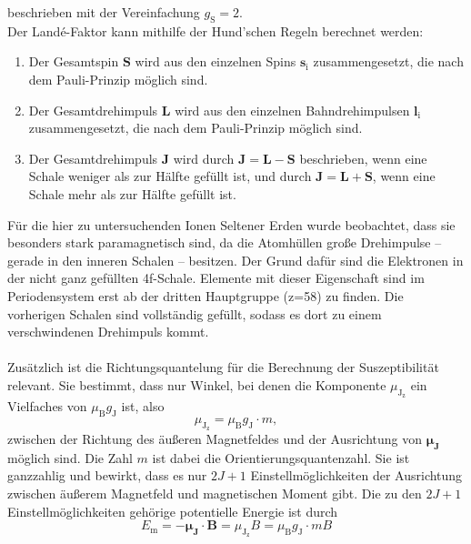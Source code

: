     beschrieben mit der Vereinfachung $g_\text{S} = 2$.\\
    Der Landé-Faktor kann mithilfe der Hund'schen Regeln berechnet werden:
    \begin{enumerate}
        \label{Hundsche_Regeln}
        \item Der Gesamtspin $\symbf{S}$ wird aus den einzelnen Spins $\symbf{s}_\text{i}$ zusammengesetzt,
        die nach dem Pauli-Prinzip möglich sind.
        \item Der Gesamtdrehimpuls $\symbf{L}$ wird aus den einzelnen Bahndrehimpulsen $\symbf{l}_\text{i}$ zusammengesetzt,
        die nach dem Pauli-Prinzip möglich sind.
        \item Der Gesamtdrehimpuls $\symbf{J}$ wird durch $\symbf{J} = \symbf{L} - \symbf{S}$ beschrieben,
        wenn eine Schale weniger als zur Hälfte gefüllt ist,
        und durch $\symbf{J} = \symbf{L} + \symbf{S}$,
        wenn eine Schale mehr als zur Hälfte gefüllt ist.
    \end{enumerate}
    Für die hier zu untersuchenden Ionen Seltener Erden wurde beobachtet,
    dass sie besonders stark paramagnetisch sind,
    da die Atomhüllen große Drehimpulse
    – gerade in den inneren Schalen –
    besitzen.
    Der Grund dafür sind die Elektronen in der nicht ganz gefüllten 4f-Schale.
    Elemente mit dieser Eigenschaft sind im Periodensystem erst ab der dritten Hauptgruppe (z=58) zu finden.
    Die vorherigen Schalen sind vollständig gefüllt,
    sodass es dort zu einem verschwindenen Drehimpuls kommt.\\
    \\
    Zusätzlich ist die Richtungsquantelung für die Berechnung der Suszeptibilität relevant.
    Sie bestimmt,
    dass nur Winkel,
    bei denen die Komponente $\mu_{\text{J}_\text{z}}$ ein Vielfaches von $\mu_\text{B} g_\text{J}$ ist,
    also
    \begin{equation*}
        \mu_{\text{J}_\text{z}} = \mu_\text{B} g_\text{J} \cdot m ,
    \end{equation*}
    zwischen der Richtung des äußeren Magnetfeldes und der Ausrichtung von $\symbf{\mu_\text{J}}$ möglich sind.
    Die Zahl $m$ ist dabei die Orientierungsquantenzahl.
    Sie ist ganzzahlig und bewirkt,
    dass es nur $2J+1$ Einstellmöglichkeiten der Ausrichtung zwischen äußerem Magnetfeld und magnetischen Moment gibt.
    Die zu den $2J+1$ Einstellmöglichkeiten gehörige potentielle Energie ist durch
    \begin{equation*}
        E_\text{m} = - \symbf{\mu_\text{J}} \cdot \symbf{B} = \mu_{\text{J}_\text{z}} B = \mu_\text{B} g_\text{J} \cdot m B
    \end{equation*} %
